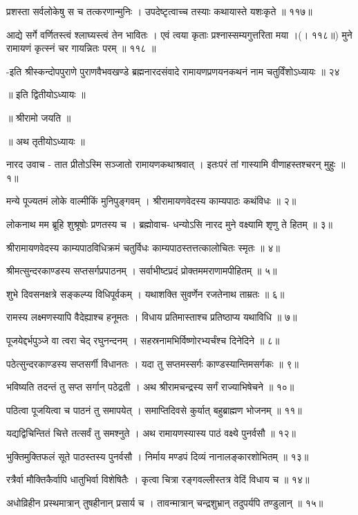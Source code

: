 प्रशस्ता सर्वलोकेषु स च तत्करणान्मुनिः ।
उपदेष्टृत्वाच्च तस्याः कथायास्ते यशःकृते ॥ ११७॥

आद्ये सर्गे वर्णितस्त्वं श्लाघ्यस्त्वं तेन भावितः ।
एवं त्वया कृताः प्रश्नास्सम्यगुत्तरिता मया ।(। ११८॥)
मुने रामायणं कृत्स्नं चर गायन्नितः परम् ॥ ११८ ॥

-इति श्रीस्कन्दोपपुराणे पुराणवैभवखण्डे ब्रह्मनारदसंवादे
रामायणप्रणयनकथनं नाम चतुर्विंशोऽध्यायः ॥ २४

॥ इति द्वितीयोऽध्यायः ॥

॥ श्रीरामो जयति ॥

॥ अथ तृतीयोऽध्यायः ॥

नारद उवाच -
तात प्रीतोऽस्मि सञ्जातो रामायणकथाश्रवात् ।
इतःपरं तां गास्यामि वीणाहस्तश्चरन् मुहुः ॥ १॥

मन्ये पूज्यतमं लोके वाल्मीकिं मुनिपुङ्गवम् ।
श्रीरामायणवेदस्य काम्यपाठः कथंविधः ॥ २॥

लोकनाथ मम ब्रूहि शुश्रूषोः प्रणतस्य च ।
ब्रह्मोवाच-
धन्योऽसि नारद मुने वक्ष्यामि श‍ृणु ते हितम् ॥ ३॥

श्रीरामायणवेदस्य काम्यपाठविधिक्रमं
चतुर्विधः काम्यपाठस्तत्तत्कालोचितः स्मृतः ॥ ४॥

श्रीमत्सुन्दरकाण्डस्य सप्तसर्गप्रपाठनम् ।
सर्वाभीष्टप्रदं प्रोक्तममराणामपीहितम् ॥ ५॥

शुभे दिवसनक्षत्रे सङ्कल्प्य विधिपूर्वकम् ।
यथाशक्ति सुवर्णेन रजतेनाथ ताम्रतः ॥ ६॥

रामस्य लक्ष्मणस्यापि वैदेह्याश्च हनूमतः ।
विधाय प्रतिमास्ताश्च प्रतिष्ठाप्य यथाविधि ॥ ७॥

पूजयेद्दर्भपुञ्जे वा त्वरा चेद् रघुनन्दनम् ।
सहस्रनामभिर्विष्णोरभ्यर्चंश्च दिनेदिने ॥ ८॥

पठेत्सुन्दरकाण्डस्य सप्तसर्गी विधानतः ।
यदा तु सप्तमस्सर्गः काण्डस्यान्तिमसर्गकः ॥ ९॥

भविष्यति तदन्तं तु सप्त सर्गान् पठेद्रती ।
अथ श्रीरामचन्द्रस्य सर्गं राज्याभिषेचने ॥ १०॥

पठित्वा पूजयित्वा च पाठनं तु समापयेत् ।
समाप्तिदिवसे कुर्यात् बहुब्राह्मण भोजनम् ॥ ११॥

यद्यद्विचिन्तितं चित्ते तत्सर्वं तु समश्नुते ।
अथ रामायणस्यास्य पाठं वक्ष्ये पुनर्वसौ ॥ १२॥

भुक्तिमुक्तिफलं सूते पाठस्तस्य पुनर्वसौ ।
निर्माय मण्डपं दिव्यं नानालङ्कारशोभितम् ॥ १३॥

रत्रैर्वा मौक्तिकैर्वापि धातुभिर्वा विशेषितैः ।
कृत्वा चित्रा रङ्गवल्लीस्तत्र वेदिं विधाय च ॥ १४॥

अधोव्रिहीन प्रस्थमात्रान् तुषहीनान् प्रसार्य च ।
तावन्मात्रान् चन्द्रशुभ्रान् तदुपर्यपि तण्डुलान् ॥ १५॥

